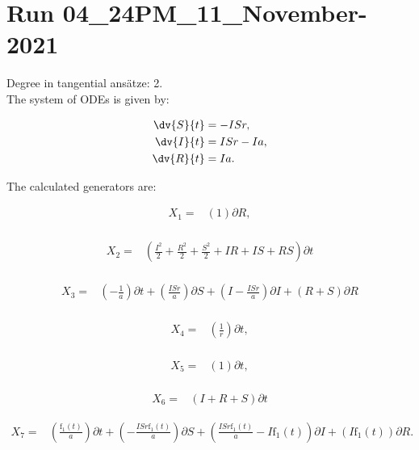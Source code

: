 \section*{Run 04\_24PM\_11\_November-2021}
Degree in tangential ansätze:	2.\\
The system of ODEs is given by:

\begin{align*}
\dv{S}{t}&=- I S r,\\
\dv{I}{t}&=I S r - I a,\\
\dv{R}{t}&=I a.\\
\end{align*}

\noindent The calculated generators are:

\begin{align*}
X_{1}=&\left(1 \right)\partial R,\\
\end{align*}

\begin{align*}
X_{2}=&\left(\frac{I^{2}}{2}+\frac{R^{2}}{2}+\frac{S^{2}}{2}+I R+I S+R S \right)\partial t\\
\end{align*}

\begin{align*}
X_{3}=&\left(- \frac{1}{a} \right)\partial t+\left(\frac{I S r}{a} \right)\partial S+\left(I- \frac{I S r}{a} \right)\partial I+\left(R+S \right)\partial R\\
\end{align*}

\begin{align*}
X_{4}=&\left(\frac{1}{r} \right)\partial t,\\
\end{align*}

\begin{align*}
X_{5}=&\left(1 \right)\partial t,\\
\end{align*}

\begin{align*}
X_{6}=&\left(I+R+S \right)\partial t
\end{align*}

\begin{align*}
X_{7}=&\left(\frac{\operatorname{f_{1}}{\left(t \right)}}{a} \right)\partial t+\left(- \frac{I S r \operatorname{f_{1}}{\left(t \right)}}{a} \right)\partial S+\left(\frac{I S r \operatorname{f_{1}}{\left(t \right)}}{a} - I \operatorname{f_{1}}{\left(t \right)} \right)\partial I+\left(I \operatorname{f_{1}}{\left(t \right)} \right)\partial R.\\
\end{align*}



